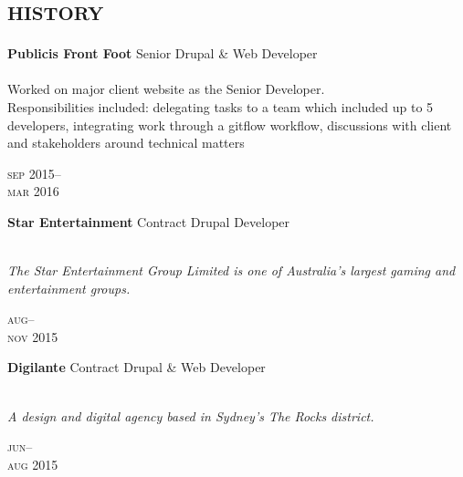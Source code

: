 
\vspace{-0.6cm}
\section*{\textsc{history}}
\vspace{-0.2cm}


\begin{minipage}[t]{0.70\textwidth}
\textbf{Publicis Front Foot}\phantom{..} Senior Drupal \& Web Developer \\
\\
Worked on major client website as the Senior Developer. 
\\
Responsibilities included: delegating tasks to a team which included up to 5 developers, integrating work through a gitflow workflow, discussions with client and stakeholders around technical matters
\\
{\small
\textit{}
\par}
\end{minipage}
\begin{minipage}[t]{0.30\textwidth}
{
\hfill \textsc{sep} 2015--\\ 
\hspace*{0pt} \hfill \textsc{mar} 2016
\par
}
\end{minipage}
\vspace{0.2in}


\begin{minipage}[t]{0.70\textwidth}
\textbf{Star Entertainment}\phantom{..} Contract Drupal Developer \\
\\
{\small
\textit{The Star Entertainment Group Limited is one of Australia's largest gaming and entertainment groups.}
\par}
\end{minipage}
\begin{minipage}[t]{0.30\textwidth}
{
\hfill \textsc{aug}--\\ 
\hspace*{0pt} \hfill \textsc{nov} 2015
\par
}
\end{minipage}
\vspace{0.2in}

\begin{minipage}[t]{0.70\textwidth}
\textbf{Digilante}\phantom{..} Contract Drupal \& Web Developer \\
\\
{\small
\textit{A design and digital agency based in Sydney's The Rocks district.}
\par}
\end{minipage}
\begin{minipage}[t]{0.30\textwidth}
{
\hfill \textsc{jun}--\\ 
\hspace*{0pt} \hfill \textsc{aug} 2015
\par
}
\end{minipage}
\vspace{0.2in}

